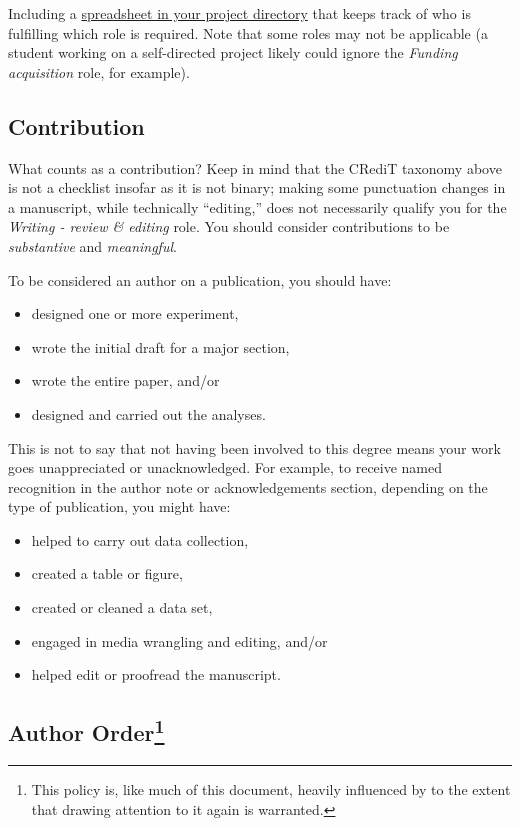 \documentclass[]{tufte-book}
\providecommand{\tightlist}{%
  \setlength{\itemsep}{0pt}\setlength{\parskip}{0pt}}
\begin{document}
Including a \href{https://osf.io/wj3hb/}{spreadsheet in your project directory} that keeps track of who is fulfilling which role is required. Note that some roles may not be applicable (a student working on a self-directed project likely could ignore the \emph{Funding acquisition} role, for example).

\hypertarget{contribution}{%
\subsection{Contribution}\label{contribution}}

What counts as a contribution? Keep in mind that the CRediT taxonomy above is not a checklist insofar as it is not binary; making some punctuation changes in a manuscript, while technically ``editing,'' does not necessarily qualify you for the \emph{Writing - review \& editing} role. You should consider contributions to be \emph{substantive} and \emph{meaningful}.

To be considered an author on a publication, you should have:

\begin{itemize}
\tightlist
\item
  designed one or more experiment,
\item
  wrote the initial draft for a major section,
\item
  wrote the entire paper, and/or
\item
  designed and carried out the analyses.
\end{itemize}

This is not to say that not having been involved to this degree means your work goes unappreciated or unacknowledged. For example, to receive named recognition in the author note or acknowledgements section, depending on the type of publication, you might have:

\begin{itemize}
\tightlist
\item
  helped to carry out data collection,
\item
  created a table or figure,
\item
  created or cleaned a data set,
\item
  engaged in media wrangling and editing, and/or
\item
  helped edit or proofread the manuscript.
\end{itemize}

\hypertarget{author-order}{%
\subsection[Author Order]{\texorpdfstring{Author Order\footnote{This policy is, like much of this document, heavily influenced by \citet{Minda_Nielsen_2018} to the extent that drawing attention to it again is warranted.}}{Author Order}}\label{author-order}}
\end{document}
